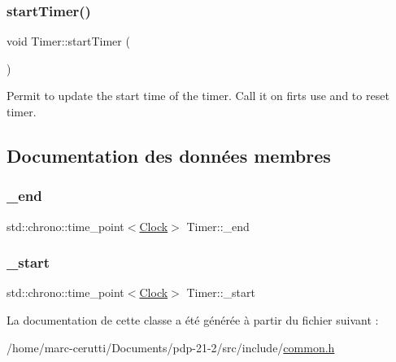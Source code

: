 \mbox{\label{class_timer_aa8c887576ec3b0d68c10ebf4097c367c}} 
\subsubsection{\texorpdfstring{start\+Timer()}{startTimer()}}
{\footnotesize\ttfamily void Timer\+::start\+Timer (\begin{DoxyParamCaption}{ }\end{DoxyParamCaption})\hspace{0.3cm}{\ttfamily [inline]}}



Permit to update the start time of the timer. Call it on firts use and to reset timer. 



\subsection{Documentation des données membres}
\mbox{\label{class_timer_ab99bbd400ec9df87fb528f817859a3fd}} 
\subsubsection{\texorpdfstring{\+\_\+end}{\_end}}
{\footnotesize\ttfamily std\+::chrono\+::time\+\_\+point$<$\hyperlink{class_timer_ab6fc5ea7e1e1e2e3cfa79f8c7cc7005e}{Clock}$>$ Timer\+::\+\_\+end\hspace{0.3cm}{\ttfamily [private]}}

\mbox{\label{class_timer_a9b41a3f523644760dd5745e409b3257a}} 
\subsubsection{\texorpdfstring{\+\_\+start}{\_start}}
{\footnotesize\ttfamily std\+::chrono\+::time\+\_\+point$<$\hyperlink{class_timer_ab6fc5ea7e1e1e2e3cfa79f8c7cc7005e}{Clock}$>$ Timer\+::\+\_\+start\hspace{0.3cm}{\ttfamily [private]}}



La documentation de cette classe a été générée à partir du fichier suivant \+:\begin{DoxyCompactItemize}
\item 
/home/marc-\/cerutti/\+Documents/pdp-\/21-\/2/src/include/\hyperlink{common_8h}{common.\+h}\end{DoxyCompactItemize}
